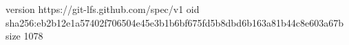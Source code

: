 version https://git-lfs.github.com/spec/v1
oid sha256:eb2b12e1a57402f706504e45e3b1b6bf675fd5b8dbd6b163a81b44c8e603a67b
size 1078
